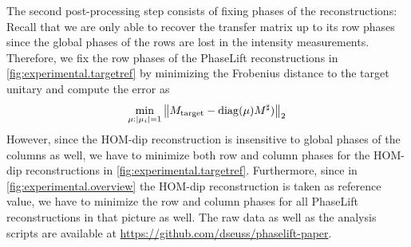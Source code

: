 The second post-processing step consists of fixing phases of the reconstructions:
Recall that we are only able to recover the transfer matrix up to its row phases since the global phases of the rows are lost in the intensity measurements.
Therefore, we fix the row phases of the PhaseLift reconstructions in \cref{fig:experimental.targetref} by minimizing the Frobenius distance to the target unitary and compute the error as
\[
  \min_{{\mu}: {\vert\mu_i\vert} = 1}\left\|  {M}_\mathrm{target} -  \mathrm{diag} ({\mu}) {M}^\sharp) \right\|_2
\]
However, since the HOM-dip reconstruction is insensitive to global phases of the columns as well, we have to minimize both row and column phases for the HOM-dip reconstructions in \cref{fig:experimental.targetref}.
Furthermore, since in \cref{fig:experimental.overview} the HOM-dip reconstruction is taken as reference value, we have to minimize the row and column phases for all PhaseLift reconstructions in that picture as well.
The raw data as well as the analysis scripts are available at \url{https://github.com/dseuss/phaselift-paper}.
